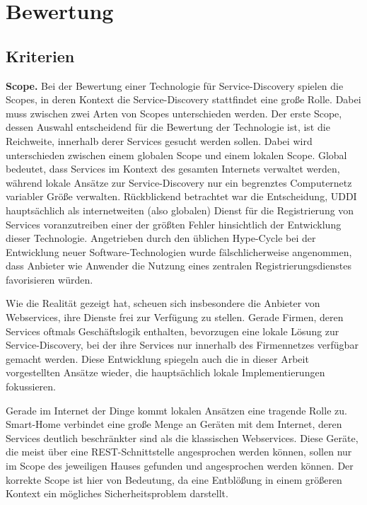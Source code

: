 \documentclass[conference,compsoc]{IEEEtran}
\begin{document}
\section{Bewertung}

\subsection{Kriterien}

\textbf{Scope.} Bei der Bewertung einer Technologie für Service-Discovery spielen die Scopes, in deren Kontext die Service-Discovery stattfindet eine große Rolle. Dabei muss zwischen zwei Arten von Scopes unterschieden werden.
Der erste Scope, dessen Auswahl entscheidend für die Bewertung der Technologie ist, ist die Reichweite, innerhalb derer Services gesucht werden sollen. Dabei wird unterschieden zwischen einem globalen Scope und einem lokalen Scope. Global bedeutet, dass Services im Kontext des gesamten Internets verwaltet werden, während lokale Ansätze zur Service-Discovery nur ein begrenztes Computernetz variabler Größe verwalten. Rückblickend betrachtet war die Entscheidung, UDDI hauptsächlich als internetweiten (also globalen) Dienst für die Registrierung von Services voranzutreiben einer der größten Fehler hinsichtlich der Entwicklung dieser Technologie. Angetrieben durch den üblichen Hype-Cycle bei der Entwicklung neuer Software-Technologien wurde fälschlicherweise angenommen, dass Anbieter wie Anwender die Nutzung eines zentralen Registrierungsdienstes favorisieren würden.

Wie die Realität gezeigt hat, scheuen sich insbesondere die Anbieter von Webservices, ihre Dienste frei zur Verfügung zu stellen. Gerade Firmen, deren Services oftmals Geschäftslogik enthalten, bevorzugen eine lokale Lösung zur Service-Discovery, bei der ihre Services nur innerhalb des Firmennetzes verfügbar gemacht werden. Diese Entwicklung spiegeln auch die in dieser Arbeit vorgestellten Ansätze wieder, die hauptsächlich lokale Implementierungen fokussieren.

Gerade im Internet der Dinge kommt lokalen Ansätzen eine tragende Rolle zu. Smart-Home verbindet eine große Menge an Geräten mit dem Internet, deren Services deutlich beschränkter sind als die klassischen Webservices. Diese Geräte, die meist über eine REST-Schnittstelle angesprochen werden können, sollen nur im Scope des jeweiligen Hauses gefunden und angesprochen werden können. Der korrekte Scope ist hier von Bedeutung, da eine Entblößung in einem größeren Kontext ein mögliches Sicherheitsproblem darstellt.
\end{document}
